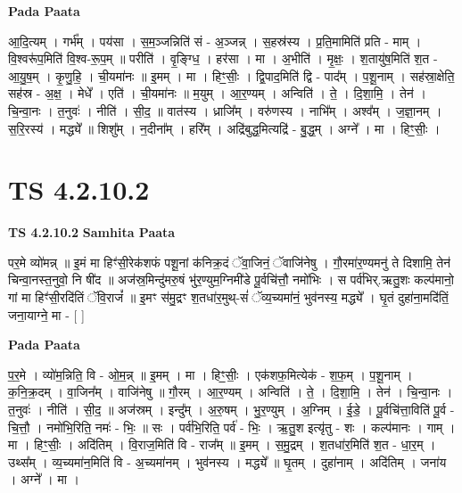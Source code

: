 \documentclass[17pt]{extarticle}
\begin{document}
\textbf{Pada Paata} \newline

आ॒दि॒त्यम् । गर्भ᳚म् । पय॑सा । स॒म॒ञ्जन्निति॑ सं - अ॒ञ्जन्न् । स॒हस्र॑स्य । प्र॒ति॒मामिति॑ प्रति - माम् । वि॒श्वरू॑प॒मिति॑ वि॒श्व-रू॒प॒म् ॥ परीति॑ । वृ॒ङ्ग्धि॒ । हर॑सा । मा । अ॒भीति॑ । मृ॒क्षः॒ । श॒तायु॑ष॒मिति॑ श॒त - आ॒यु॒ष॒म् । कृ॒णु॒हि॒ । ची॒यमा॑नः ॥ इ॒मम् । मा । हिꣳ॒॒सीः॒ । द्वि॒पाद॒मिति॑ द्वि - पाद᳚म् । प॒शू॒नाम् । सह॑स्रा॒क्षेति॒ सह॑स्र - अ॒क्ष॒ । मेधे᳚ । एति॑ । ची॒यमा॑नः ॥ म॒युम् । आ॒र॒ण्यम् । अन्विति॑ । ते॒ । दि॒शा॒मि॒ । तेन॑ । चि॒न्वा॒नः । त॒नुवः॑ । नीति॑ । सी॒द॒ ॥ वात॑स्य । ध्राजि᳚म् । वरु॑णस्य । नाभि᳚म् । अश्व᳚म् । ज॒ज्ञा॒नम् । स॒रि॒रस्य॑ । मद्ध्ये᳚ ॥ शिशु᳚म् । न॒दीना᳚म् । हरि᳚म् । अद्रि॑बुद्ध॒मित्यद्रि॑ - बु॒द्ध॒म् । अग्ने᳚ । मा । हिꣳ॒॒सीः॒ ।  \newline




\section*{ TS 4.2.10.2 }

\textbf{TS 4.2.10.2 } \newline
\textbf{Samhita Paata} \newline

पर॒मे व्यो॑मन्न् ॥ इ॒मं मा हिꣳ॑सी॒रेक॑शफं पशू॒नां क॑निक्र॒दं ॅवा॒जिनं॒ ॅवाजि॑नेषु । गौ॒रमा॑र॒ण्यमनु॑ ते दिशामि॒ तेन॑ चिन्वा॒नस्त॒नुवो॒ नि षी॑द ॥ अज॑स्र॒मिन्दु॑मरु॒षं भु॑र॒ण्युम॒ग्निमी॑डे पू॒र्वचि॑त्तौ॒ नमो॑भिः । स पर्व॑भिर्.ऋतु॒शः कल्प॑मानो॒ गां मा हिꣳ॑सी॒रदि॑तिं ॅवि॒राजं᳚ ॥ इ॒मꣳ स॑मु॒द्रꣳ श॒तधा॑र॒मुथ्-सं॑ ॅव्य॒च्यमा॑नं॒ भुव॑नस्य॒ मद्ध्ये᳚ । घृ॒तं दुहा॑ना॒मदि॑तिं॒ जना॒याग्ने॒ मा - [  ] \newline

\textbf{Pada Paata} \newline

प॒र॒मे । व्यो॑म॒न्निति॒ वि - ओ॒म॒न्न् ॥ इ॒मम् । मा । हिꣳ॒॒सीः॒ । एक॑शफ॒मित्येक॑ - श॒फ॒म् । प॒शू॒नाम् । क॒नि॒क्र॒दम् । वा॒जिन᳚म् । वाजि॑नेषु ॥ गौ॒रम् । आ॒र॒ण्यम् । अन्विति॑ । ते॒ । दि॒शा॒मि॒ । तेन॑ । चि॒न्वा॒नः । त॒नुवः॑ । नीति॑ । सी॒द॒ ॥ अज॑स्रम् । इन्दु᳚म् । अ॒रु॒षम् । भु॒र॒ण्युम् । अ॒ग्निम् । ई॒डे॒ । पू॒र्वचि॑त्ता॒विति॑ पू॒र्व - चि॒त्तौ॒ । नमो॑भि॒रिति॒ नमः॑ - भिः॒ ॥ सः । पर्व॑भि॒रिति॒ पर्व॑ - भिः॒ । ऋ॒तु॒श इत्यृ॑तु - शः । कल्प॑मानः । गाम् । मा । हिꣳ॒॒सीः॒ । अदि॑तिम् । वि॒राज॒मिति॑ वि - राज᳚म् ॥ इ॒मम् । स॒मु॒द्रम् । श॒तधा॑र॒मिति॑ श॒त - धा॒र॒म् । उथ्स᳚म् । व्य॒च्यमा॑न॒मिति॑ वि - अ॒च्यमा॑नम् । भुव॑नस्य । मद्ध्ये᳚ ॥ घृ॒तम् । दुहा॑नाम् । अदि॑तिम् । जना॑य । अग्ने᳚ । मा ।  \newline
\end{document}
